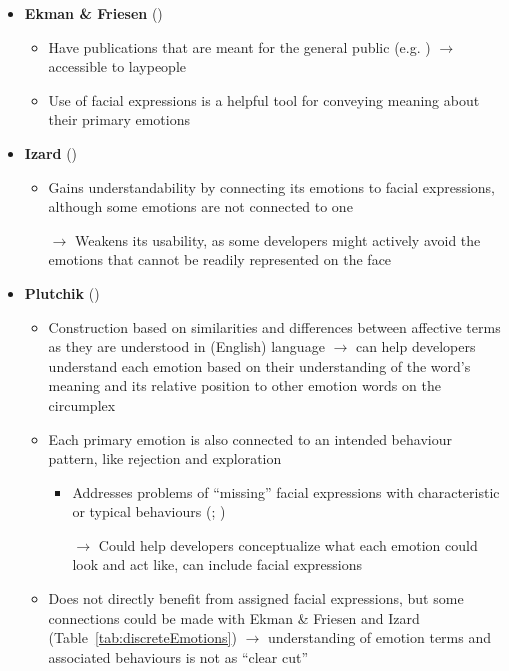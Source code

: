 \begin{itemize}
    \item \textbf{Ekman \& Friesen} (\strong)
    \begin{itemize}
        \item Have publications that are meant for the general public (e.g.
        \cite{ekman2007emotions}) $\rightarrow$ accessible to laypeople

        \item Use of facial expressions is a helpful tool for conveying meaning
        about their primary emotions
    \end{itemize}

    \item \textbf{Izard} (\weak)
    \begin{itemize}
        \item Gains understandability by connecting its emotions to facial
        expressions, although some emotions are not connected to one

        \item [$\rightarrow$] Weakens its usability, as some developers might
        actively avoid the emotions that cannot be readily represented on the
        face
    \end{itemize}

    \item \textbf{Plutchik} (\good)
    \begin{itemize}
        \item Construction based on similarities and differences between
        affective terms as they are understood in (English) language
        $\rightarrow$ can help developers understand each emotion based on
        their understanding of the word's meaning and its relative position to
        other emotion words on the circumplex

        \item Each primary emotion is also connected to an intended behaviour
        pattern, like rejection and
        exploration~\citep[p.~202]{plutchik1984emotions}
        \begin{itemize}
            \item  Addresses problems of ``missing'' facial expressions with
            characteristic or typical behaviours
            (;
            )

            \item [$\rightarrow$] Could help developers conceptualize what each
            emotion could look and act like, can include facial expressions
        \end{itemize}

        \item Does not directly benefit from assigned facial expressions, but
        some connections could be made with Ekman \& Friesen and Izard
        (Table~\ref{tab:discreteEmotions}) $\rightarrow$ understanding of
        emotion terms and associated behaviours is not as ``clear cut''
    \end{itemize}
\end{itemize}

